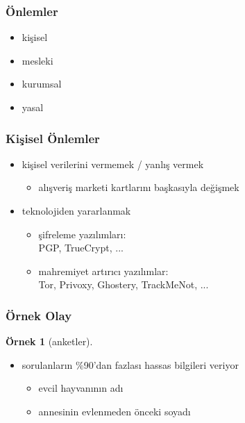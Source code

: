 \documentclass[dvipsnames]{beamer}
\theoremstyle{definition}
\theoremstyle{example}
\newtheorem{ornek}[theorem]{Örnek}
\theoremstyle{plain}
\begin{document}
\begin{frame}
  \frametitle{Önlemler}

  \begin{itemize}
    \item kişisel
    \item mesleki
    \item kurumsal
    \item yasal
  \end{itemize}
\end{frame}

\begin{frame}
  \frametitle{Kişisel Önlemler}

  \begin{itemize}
    \item kişisel verilerini vermemek / yanlış vermek
    \begin{itemize}
      \item alışveriş marketi kartlarını başkasıyla değişmek
    \end{itemize}

    \item teknolojiden yararlanmak
    \begin{itemize}
      \item şifreleme yazılımları:\\
        PGP, TrueCrypt, ...
      \item mahremiyet artırıcı yazılımlar:\\
        Tor, Privoxy, Ghostery, TrackMeNot, ...
    \end{itemize}
  \end{itemize}
\end{frame}

\begin{frame}
  \frametitle{Örnek Olay}

  \begin{ornek}[anketler]
    \begin{itemize}
      \item sorulanların \%90'dan fazlası hassas bilgileri veriyor
      \begin{itemize}
        \item evcil hayvanının adı
        \item annesinin evlenmeden önceki soyadı
      \end{itemize}
    \end{itemize}
  \end{ornek}
\end{frame}
\end{document}
